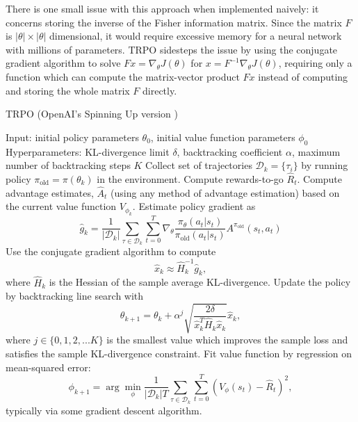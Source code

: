 There is one small issue with this approach when implemented naively: it concerns storing the inverse of the Fisher information matrix. Since 
the matrix $F$ is $|\theta|\times|\theta|$ dimensional, it would require excessive memory for a neural network with millions of parameters.
TRPO sidesteps the issue by using the conjugate gradient algorithm to solve $Fx =  \nabla_\theta J(\theta)$ for $x = F^{-1}  \nabla_\theta 
J(\theta)$, requiring only a function which can compute the matrix-vector product $Fx$ instead of computing and storing the whole matrix $F$ 
directly.
\begin{algorithm}[H] 
\caption{TRPO (OpenAI’s Spinning Up version \cite{OpenAI_Spinning_UP})} 
\label{algo:trpo} 
\begin{algorithmic} 
\STATE Input: initial policy parameters $\theta_0$, initial value function parameters $\phi_0$ 
\STATE Hyperparameters: KL-divergence limit $\delta$, backtracking coefficient $\alpha$, maximum number of backtracking steps $K$ 
\STATE Collect set of trajectories ${\mathcal D}_k = \{\tau_i\}$ by running policy $\pi_\text{old} = \pi(\theta_k)$ in the environment. 
\STATE Compute rewards-to-go $\hat{R}_t$. 
\STATE Compute advantage estimates, $\hat{A}_t$ (using any method of advantage estimation) based on the current value function $V_{\phi_k}$. 
\STATE Estimate policy gradient as 
\begin{equation*} \hat{g}_k = \frac{1}{|{\mathcal D}_k|} \sum_{\tau \in {\mathcal D}_k} \sum_{t=0}^T \nabla_\theta \frac{\pi_{\theta}(a_t|s_t)}{\pi_{\text{old}}(a_t|s_t)} A^{\pi_{\text{old}}}(s_t,a_t)
\end{equation*} 
\STATE Use the conjugate gradient algorithm to compute 
\begin{equation*} \hat{x}_k \approx \hat{H}_k^{-1} \hat{g}_k, \end{equation*}
where $\hat{H}_k$ is the Hessian of the sample average KL-divergence. 
\STATE Update the policy by backtracking line search with \begin{equation*} \theta_{k+1} = \theta_k + \alpha^j \sqrt{ \frac{2\delta}
{\hat{x}_k^T \hat{H}_k \hat{x}_k}} \hat{x}_k, \end{equation*} where $j \in \{0, 1, 2, ... K\}$ is the smallest value which improves the 
sample loss and satisfies the sample KL-divergence constraint. 
\STATE Fit value function by regression on mean-squared error: \begin{equation*} \phi_{k+1} = \arg \min_{\phi} \frac{1}{|{\mathcal D}_k| T} 
\sum_{\tau \in {\mathcal D}_k} \sum_{t=0}^T\left( V_{\phi} (s_t) - \hat{R}_t \right)^2, \end{equation*} typically via some gradient descent 
algorithm. 
\ENDFOR 
\end{algorithmic} 
\end{algorithm}

